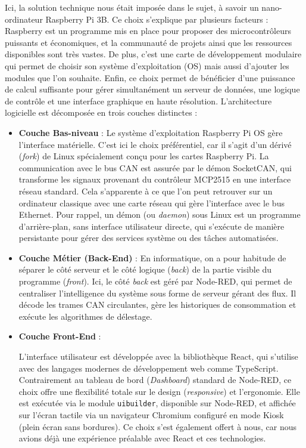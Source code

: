         Ici, la solution technique nous était imposée dans le sujet, à savoir un nano-ordinateur Raspberry Pi 3B. Ce choix s'explique par plusieurs facteurs : Raspberry est un programme mis en place pour proposer des microcontrôleurs puissants et économiques, et la communauté de projets ainsi que les ressources disponibles sont très vastes. De plus, c'est une carte de développement modulaire qui permet de choisir son système d'exploitation (OS) mais aussi d'ajouter les modules que l'on souhaite. Enfin, ce choix permet de bénéficier d'une puissance de calcul suffisante pour gérer simultanément un serveur de données, une logique de contrôle et une interface graphique en haute résolution.
        \vspace{0.5cm}
        L'architecture logicielle est décomposée en trois couches distinctes :
        \begin{itemize}
            \item \textbf{Couche Bas-niveau} : Le système d'exploitation Raspberry Pi OS gère l'interface matérielle. C'est ici le choix préférentiel, car il s'agit d'un dérivé (\textit{fork}) de Linux spécialement conçu pour les cartes Raspberry Pi. La communication avec le bus CAN est assurée par le démon SocketCAN, qui transforme les signaux provenant du contrôleur MCP2515 en une interface réseau standard. Cela s'apparente à ce que l'on peut retrouver sur un ordinateur classique avec une carte réseau qui gère l'interface avec le bus Ethernet. Pour rappel, un démon (ou \textit{daemon}) sous Linux est un programme d'arrière-plan, sans interface utilisateur directe, qui s'exécute de manière persistante pour gérer des services système ou des tâches automatisées.
            \item \textbf{Couche Métier (Back-End)} : En informatique, on a pour habitude de séparer le côté serveur et le côté logique (\textit{back}) de la partie visible du programme (\textit{front}). Ici, le côté \textit{back} est géré par Node-RED, qui permet de centraliser l'intelligence du système sous forme de serveur gérant des flux. Il décode les trames CAN circulantes, gère les historiques de consommation et exécute les algorithmes de délestage.

            \item \textbf{Couche Front-End} : \begin{sloppypar}L'interface utilisateur est développée avec la bibliothèque React, qui s'utilise avec des langages modernes de développement web comme TypeScript. Contrairement au tableau de bord (\textit{Dashboard}) standard de Node-RED, ce choix offre une flexibilité totale sur le design (\textit{responsive}) et l'ergonomie. Elle est exécutée via le module \texttt{uibuilder}, disponible sur Node-RED, et affichée sur l'écran tactile via un navigateur Chromium configuré en mode Kiosk (plein écran sans bordures). Ce choix s'est également offert à nous, car nous avions déjà une expérience préalable avec React et ces technologies.\end{sloppypar}
        \end{itemize}

